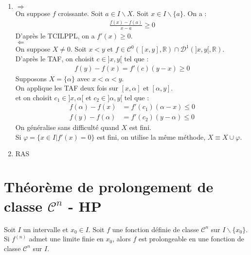 \documentclass[../main.tex]{subfiles}
\begin{document}
\begin{enumerate}
    \item $\boxed{\Rightarrow}$ \\
    On suppose $f$ croissante. Soit $a \in I\backslash X$. Soit $x \in I \backslash \{a\}$. On a : 
    \begin{align*}
        \frac{f(x) - f(a)}{x - a} \geq 0
    \end{align*}
    D'après le TCILPPL, on a $f'(x) \geq 0$. \\
    $\boxed{\Leftarrow}$ \\
    On suppose $X \neq 0$. Soit $x < y$ et $f \in \mathcal{C}^0([x, y], \mathbb{R}) \cap \mathcal{D}^1(]x, y[, \mathbb{R})$. \\
    D'après le TAF, on choisit $c\in ]x, y[$ tel que :
    \begin{align*}
        f(y) - f(x) = f'(c)(y - x) \geq 0
    \end{align*}
    Supposons $X = \{\alpha\}$ avec $x < \alpha < y$. \\
    On applique les TAF deux fois sur $[x, \alpha]$ et $[\alpha, y]$. \\ et on choisit $c_1\in ]x, \alpha[$ et $c_2\in ]\alpha, y[$ tel que : 
    \begin{align*}
        f(\alpha) - f(x) &= f'(c_1)(\alpha - x) \leq 0 \\
        f(y) - f(\alpha) &= f'(c_2)(y - \alpha) \leq 0
    \end{align*}
    On généralise sans difficulté quand $X$ est fini. \\
    Si $\varphi = \{x \in I | f'(x) = 0\}$ est fini, on utilise la même méthode, $X \equiv X \cup \varphi$. \\
    \item RAS
\end{enumerate}

\section{Théorème de prolongement de classe $\mathcal{C}^n$ - HP}
\begin{tcolorbox}[title=Théorème 18.43 - HP, title filled=false, colframe=orange, colback=orange!10!white]
    Soit $I$ un intervalle et $x_0 \in I$. Soit $f$ une fonction définie de classe $\mathcal{C}^n$ sur $I\backslash \{x_0\}$. Si $f^{(n)}$ admet une limite finie en $x_0$, alors $f$ est prolongeable en une fonction de classe $\mathcal{C}^n$ sur $I$.
\end{tcolorbox}
\end{document}
